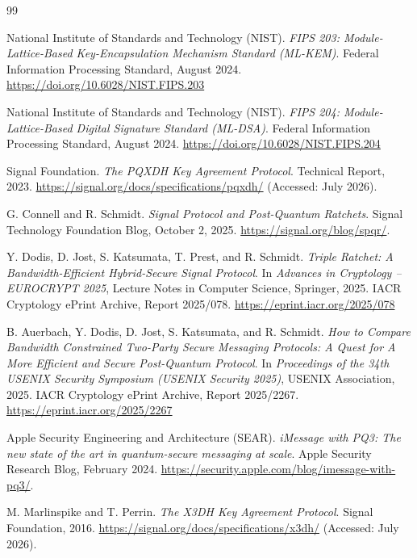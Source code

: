 \documentclass[11pt,a4paper]{article}
\theoremstyle{remark}
\theoremstyle{plain}
\begin{document}
\begin{thebibliography}{99}
{}

National Institute of Standards and Technology (NIST).
\emph{FIPS 203: Module-Lattice-Based Key-Encapsulation Mechanism Standard (ML-KEM)}.
Federal Information Processing Standard, August 2024.
\url{https://doi.org/10.6028/NIST.FIPS.203}

National Institute of Standards and Technology (NIST).
\emph{FIPS 204: Module-Lattice-Based Digital Signature Standard (ML-DSA)}.
Federal Information Processing Standard, August 2024.
\url{https://doi.org/10.6028/NIST.FIPS.204}

Signal Foundation.
\emph{The PQXDH Key Agreement Protocol}.
Technical Report, 2023.
\url{https://signal.org/docs/specifications/pqxdh/} (Accessed: July 2026).

G. Connell and R. Schmidt.
\emph{Signal Protocol and Post-Quantum Ratchets}.
Signal Technology Foundation Blog, October 2, 2025.
\url{https://signal.org/blog/spqr/}.

Y. Dodis, D. Jost, S. Katsumata, T. Prest, and R. Schmidt.
\emph{Triple Ratchet: A Bandwidth-Efficient Hybrid-Secure Signal Protocol}.
In \emph{Advances in Cryptology -- EUROCRYPT 2025}, Lecture Notes in Computer Science, Springer, 2025.
IACR Cryptology ePrint Archive, Report 2025/078.
\url{https://eprint.iacr.org/2025/078}

B. Auerbach, Y. Dodis, D. Jost, S. Katsumata, and R. Schmidt.
\emph{How to Compare Bandwidth Constrained Two-Party Secure Messaging Protocols: A Quest for A More Efficient and Secure Post-Quantum Protocol}.
In \emph{Proceedings of the 34th USENIX Security Symposium (USENIX Security 2025)}, USENIX Association, 2025.
IACR Cryptology ePrint Archive, Report 2025/2267.
\url{https://eprint.iacr.org/2025/2267}

Apple Security Engineering and Architecture (SEAR).
\emph{iMessage with PQ3: The new state of the art in quantum-secure messaging at scale}.
Apple Security Research Blog, February 2024.
\url{https://security.apple.com/blog/imessage-with-pq3/}.

M. Marlinspike and T. Perrin.
\emph{The X3DH Key Agreement Protocol}.
Signal Foundation, 2016.
\url{https://signal.org/docs/specifications/x3dh/} (Accessed: July 2026).


\end{thebibliography}
\end{document}
